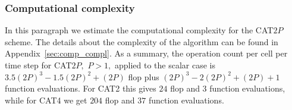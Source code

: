 \subsubsection{Computational complexity}\label{sec:Comput_Comp}
In this paragraph we estimate the  computational complexity for the CAT$2P$ scheme. 
The details about the complexity of the algorithm can be found in Appendix~\ref{sec:comp_compl}.
As a summary, the operation count per cell per time step for CAT$2P,$ $P>1,$ applied to the scalar case is $3.5(2P)^3 - 1.5(2P)^2 + (2P)$ flop plus $(2P)^3 - 2(2P)^2 + (2P) + 1$ function evaluations. 
For CAT2 this gives $24$ flop and $3$ function evaluations, while for CAT4 we get $204$ flop and $37$ function evaluations.

%
% 
%
%
